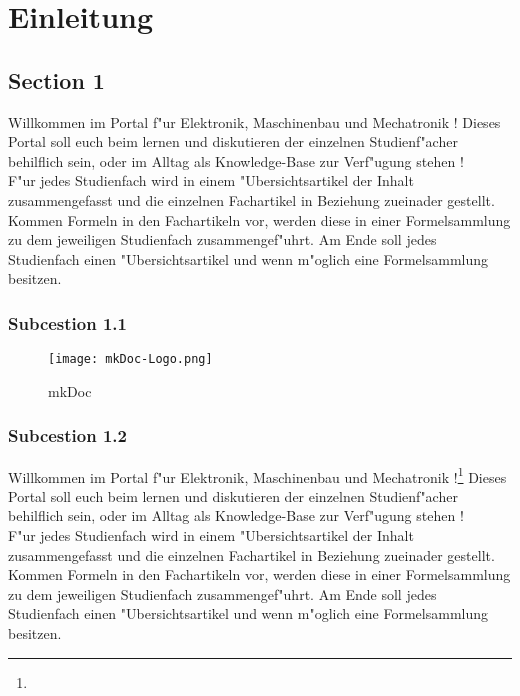 \chapter{Einleitung}
\label{cha:Einleitung}

\section{Section 1}
\label{sec:1Section1}
Willkommen im Portal f"ur Elektronik, Maschinenbau und Mechatronik !
Dieses Portal soll euch beim lernen und diskutieren der einzelnen Studienf"acher behilflich sein, oder im Alltag als Knowledge-Base zur Verf"ugung stehen ! \\
F"ur jedes Studienfach wird in einem "Ubersichtsartikel der Inhalt zusammengefasst und die einzelnen Fachartikel in Beziehung zueinader gestellt. Kommen Formeln in den Fachartikeln vor, werden diese in einer Formelsammlung zu dem jeweiligen Studienfach zusammengef"uhrt. Am Ende soll jedes Studienfach einen "Ubersichtsartikel und wenn m"oglich eine Formelsammlung besitzen.

\subsection{Subcestion 1.1}
\label{subsec:1Subcestion1.1}

\begin{figure}[htb]
\centering
\texttt{[image: mkDoc-Logo.png]}
\caption{mkDoc}
\label{fig:mkDoc}
\end{figure}


\subsection{Subcestion 1.2}
\label{subsec:1Subcestion 1.2}
Willkommen im Portal f"ur Elektronik, Maschinenbau und Mechatronik !\footnote{\Vgl{}}
Dieses Portal soll euch beim lernen und diskutieren der einzelnen Studienf"acher behilflich sein, oder im Alltag als Knowledge-Base zur Verf"ugung stehen ! \\
F"ur jedes Studienfach wird in einem "Ubersichtsartikel der Inhalt zusammengefasst und die einzelnen Fachartikel in Beziehung zueinader gestellt. Kommen Formeln in den Fachartikeln vor, werden diese in einer Formelsammlung zu dem jeweiligen Studienfach zusammengef"uhrt. Am Ende soll jedes Studienfach einen "Ubersichtsartikel und wenn m"oglich eine Formelsammlung besitzen.
